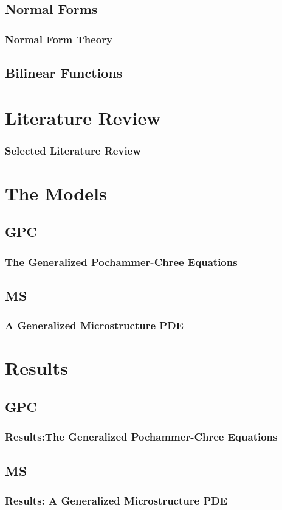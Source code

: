 \documentclass[10pt]{beamer}
\begin{document}
\subsection{Normal Forms}

\frame
{
    \frametitle{Normal Form Theory}
}

\subsection{Bilinear Functions}
\section{Literature Review}

\frame
{
  \frametitle{Selected Literature Review}

}

\section{The Models}
\subsection{GPC}
\frame
{
  \frametitle{The Generalized Pochammer-Chree Equations}
}
\subsection{MS}
\frame
{
  \frametitle{ A Generalized Microstructure PDE}
}
\section{Results}
\subsection{GPC}
\frame
{
  \frametitle{Results:The Generalized Pochammer-Chree Equations}
}
\subsection{MS}
\frame
{
  \frametitle{Results: A Generalized Microstructure PDE}
}
\end{document}
